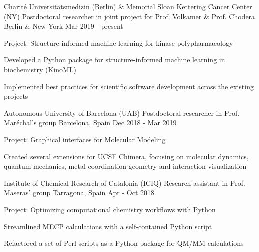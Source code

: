 


\begin{cventries}
  \cventry
    {Charité Universitätsmedizin (Berlin) \& Memorial Sloan Kettering Cancer Center (NY)} %
    {Postdoctoral researcher in joint project for Prof. Volkamer \& Prof. Chodera}  %
    {Berlin \& New York} %
    {Mar 2019 - present} %
    {
      \begin{cvitems} %
        \item {Project: Structure-informed machine learning for kinase polypharmacology}
        \item {Developed a Python package for structure-informed machine learning in biochemistry (KinoML)}
        \item {Implemented best practices for scientific software development across the existing projects\\}
      \end{cvitems}
    }
  \cventry
    {Autonomous University of Barcelona (UAB)} %
    {Postdoctoral researcher in Prof. Maréchal's group} %
    {Barcelona, Spain} %
    {Dec 2018 - Mar 2019} %
    {
      \begin{cvitems} %
        \item {Project: Graphical interfaces for Molecular Modeling}
        \item {Created several extensions for UCSF Chimera, focusing on molecular dynamics,\\
              quantum mechanics, metal coordination geometry and interaction visualization\\}
      \end{cvitems}
    }

  \cventry
    {Institute of Chemical Research of Catalonia (ICIQ)} %
    {Research assistant in Prof. Maseras' group} %
    {Tarragona, Spain} %
    {Apr - Oct 2018} %
    {
      \begin{cvitems} %
        \item {Project: Optimizing computational chemistry workflows with Python}
        \item {Streamlined MECP calculations with a self-contained Python script}
        \item {Refactored a set of Perl scripts as a Python package for QM/MM calculations\\}
      \end{cvitems}
    }


\end{cventries}
